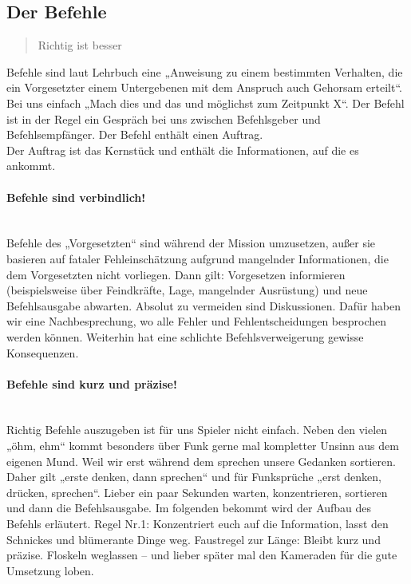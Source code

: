 \subsection{Der Befehle}
\begin{quote}
	\glqq Richtig ist besser\grqq
\end{quote}
Befehle sind laut Lehrbuch eine „Anweisung zu einem bestimmten Verhalten, die ein Vorgesetzter einem Untergebenen mit dem Anspruch auch Gehorsam erteilt“. Bei uns einfach „Mach dies und das und möglichst zum Zeitpunkt X“. Der Befehl ist in der Regel ein Gespräch bei uns zwischen Befehlsgeber und Befehlsempfänger. Der Befehl enthält einen Auftrag.\\
Der Auftrag ist das Kernstück und enthält die Informationen, auf die es ankommt.

\paragraph*{Befehle sind verbindlich!}\hfil\\
Befehle des „Vorgesetzten“ sind während der Mission umzusetzen, außer sie basieren auf fataler Fehleinschätzung aufgrund mangelnder Informationen, die dem Vorgesetzten nicht vorliegen. Dann gilt: Vorgesetzen informieren (beispielsweise über Feindkräfte, Lage, mangelnder Ausrüstung) und neue Befehlsausgabe abwarten. Absolut zu vermeiden sind Diskussionen. Dafür haben wir eine Nachbesprechung, wo alle Fehler und Fehlentscheidungen besprochen werden können. Weiterhin hat eine schlichte Befehlsverweigerung gewisse Konsequenzen.

\paragraph*{Befehle sind kurz und präzise!}\hfil\\
Richtig Befehle auszugeben ist für uns Spieler nicht einfach. 
Neben den vielen „öhm, ehm“ kommt besonders über Funk gerne mal kompletter Unsinn aus dem eigenen Mund. 
Weil wir erst während dem sprechen unsere Gedanken sortieren. 
Daher gilt „erste denken, dann sprechen“ und für Funksprüche „erst denken, drücken, sprechen“. Lieber ein paar Sekunden warten, konzentrieren, sortieren und dann die Befehlsausgabe.
Im folgenden bekommt wird der Aufbau des Befehls erläutert. Regel Nr.1: Konzentriert euch auf die Information, lasst den Schnickes und blümerante Dinge weg.
Faustregel zur Länge: Bleibt kurz und präzise. Floskeln weglassen -- und lieber später mal den Kameraden für die gute Umsetzung loben. 

